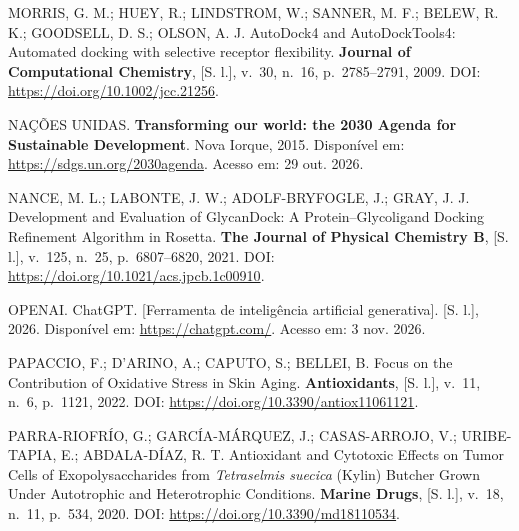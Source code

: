 \begin{samepage}
\filbreak\hypertarget{cite.0@morris2009autodock}{}MORRIS, G. M.; HUEY, R.; LINDSTROM, W.; SANNER, M. F.; BELEW, R. K.; GOODSELL, D. S.; OLSON, A. J. AutoDock4 and AutoDockTools4: Automated docking with selective receptor flexibility. \textbf{Journal of Computational Chemistry}, [S. l.], v.~30, n.~16, p.~2785--2791, 2009. DOI: \url{https://doi.org/10.1002/jcc.21256}.
\end{samepage}

\begin{samepage}
\filbreak\hypertarget{cite.0@onu2015agenda}{}NAÇÕES UNIDAS. \textbf{Transforming our world: the 2030 Agenda for Sustainable Development}. Nova Iorque, 2015. Disponível em: \url{https://sdgs.un.org/2030agenda}. Acesso em: 29 out. 2026.
\end{samepage}

\begin{samepage}
\filbreak\hypertarget{cite.0@nance2021}{}NANCE, M. L.; LABONTE, J. W.; ADOLF-BRYFOGLE, J.; GRAY, J. J. Development and Evaluation of GlycanDock: A Protein--Glycoligand Docking Refinement Algorithm in Rosetta. \textbf{The Journal of Physical Chemistry B}, [S. l.], v.~125, n.~25, p.~6807--6820, 2021. DOI: \url{https://doi.org/10.1021/acs.jpcb.1c00910}.
\end{samepage}

\begin{samepage}
\filbreak\hypertarget{cite.0@openai2026}{}OPENAI. ChatGPT. [Ferramenta de inteligência artificial generativa]. [S. l.], 2026. Disponível em: \url{https://chatgpt.com/}. Acesso em: 3 nov. 2026.
\end{samepage}

\begin{samepage}
\filbreak\hypertarget{cite.0@papaccio2022}{}PAPACCIO, F.; D'ARINO, A.; CAPUTO, S.; BELLEI, B. Focus on the Contribution of Oxidative Stress in Skin Aging. \textbf{Antioxidants}, [S. l.], v.~11, n.~6, p.~1121, 2022. DOI: \url{https://doi.org/10.3390/antiox11061121}.
\end{samepage}

\begin{samepage}
\filbreak\hypertarget{cite.0@parra2020}{}PARRA-RIOFRÍO, G.; GARCÍA-MÁRQUEZ, J.; CASAS-ARROJO, V.; URIBE-TAPIA, E.; ABDALA-DÍAZ, R. T. Antioxidant and Cytotoxic Effects on Tumor Cells of Exopolysaccharides from \textit{Tetraselmis suecica} (Kylin) Butcher Grown Under Autotrophic and Heterotrophic Conditions. \textbf{Marine Drugs}, [S. l.], v.~18, n.~11, p.~534, 2020. DOI: \url{https://doi.org/10.3390/md18110534}.
\end{samepage}

